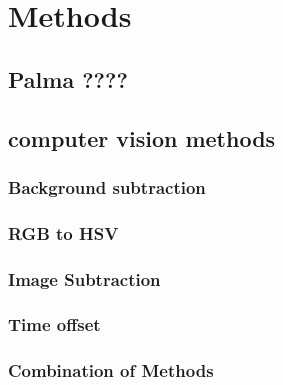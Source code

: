 \chapter{Methods}
\label{ch:methods}


\section{Palma ????}

\section{computer vision methods}

\subsection{Background subtraction}

\subsection{RGB to HSV}

\subsection{Image Subtraction}

\subsection{Time offset}

\subsection{Combination of Methods}